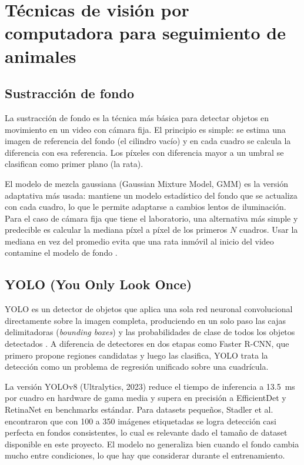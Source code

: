 \section{Técnicas de visión por computadora para seguimiento de animales}

\subsection{Sustracción de fondo}

La sustracción de fondo es la técnica más básica para detectar objetos en movimiento
en un video con cámara fija. El principio es simple: se estima una imagen de referencia
del fondo (el cilindro vacío) y en cada cuadro se calcula la diferencia con esa
referencia. Los píxeles con diferencia mayor a un umbral se clasifican como primer plano
(la rata).

El modelo de mezcla gaussiana (Gaussian Mixture Model, GMM) \cite{zivkovic2004} es
la versión adaptativa más usada: mantiene un modelo estadístico del fondo que se
actualiza con cada cuadro, lo que le permite adaptarse a cambios lentos de iluminación.
Para el caso de cámara fija que tiene el laboratorio, una alternativa más simple y
predecible es calcular la mediana píxel a píxel de los primeros $N$ cuadros. Usar la
mediana en vez del promedio evita que una rata inmóvil al inicio del video contamine
el modelo de fondo \cite{piccardi2004}.

\subsection{YOLO (You Only Look Once)}

YOLO es un detector de objetos que aplica una sola red neuronal convolucional
directamente sobre la imagen completa, produciendo en un solo paso las cajas
delimitadoras (\textit{bounding boxes}) y las probabilidades de clase de todos los
objetos detectados \cite{jocher2023}. A diferencia de detectores en dos etapas como
Faster R-CNN, que primero propone regiones candidatas y luego las clasifica, YOLO
trata la detección como un problema de regresión unificado sobre una cuadrícula.

La versión YOLOv8 (Ultralytics, 2023) reduce el tiempo de inferencia a 13.5~ms por
cuadro en hardware de gama media y supera en precisión a EfficientDet y RetinaNet en
benchmarks estándar. Para datasets pequeños, Stadler et al.\ \cite{stadler2024_yolov8}
encontraron que con 100 a 350 imágenes etiquetadas se logra detección casi perfecta en
fondos consistentes, lo cual es relevante dado el tamaño de dataset disponible en este
proyecto. El modelo no generaliza bien cuando el fondo cambia mucho entre condiciones,
lo que hay que considerar durante el entrenamiento.

